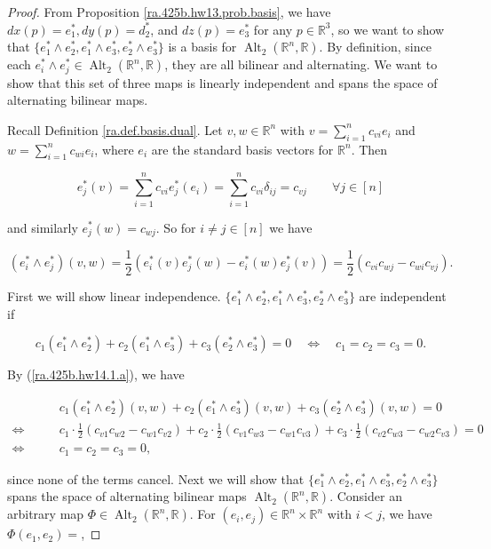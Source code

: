 \begin{proof}

From Proposition \ref{ra.425b.hw13.prob.basis}, we have \(dx(p) = e_1^*, dy(p) = d_2^*\), and \(dz(p) = e_3^*\) for any \(p \in \mathbb{R}^3\), so we want to show that \(\{e_1^* \wedge e_2^*, e_1^* \wedge e_3^*, e_2^* \wedge e_3^*\}\) is a basis for \(\operatorname{Alt}_2(\mathbb{R}^n, \mathbb{R})\). By definition, since each \(e_i^* \wedge e_j^* \in  \operatorname{Alt}_2(\mathbb{R}^n, \mathbb{R})\), they are all bilinear and alternating. We want to show that this set of three maps is linearly independent and spans the space of alternating bilinear maps.

Recall Definition \ref{ra.def.basis.dual}. Let \(v, w \in \mathbb{R}^n\) with \(v = \sum_{i=1}^n c_{vi} e_i\) and \(w = \sum_{i=1}^n c_{wi} e_i\), where \(e_i\) are the standard basis vectors for \(\mathbb{R}^n\). Then

\[
e_j^*(v)  = \sum_{i=1}^n c_{vi} e_j^*(e_i) = \sum_{i=1}^n c_{vi} \delta_{ij} = c_{vj} \qquad \forall j \in [n]
\]

and similarly \(e_j^*(w) = c_{wj}\). So for \(i \neq j \in [n]\) we have

\begin{equation}\label{ra.425b.hw14.1.a}
(e_i^* \wedge e_j^*)(v,w) = \frac{1}{2}( e_i^*(v) e_j^*(w) - e_i^*(w) e_j^*(v)) = \frac{1}{2}( c_{vi} c_{wj} - c_{wi} c_{vj}).
\end{equation}

%

First we will show linear independence. \(\{e_1^* \wedge e_2^*, e_1^* \wedge e_3^*, e_2^* \wedge e_3^*\}\) are independent if 

\[
c_1 (e_1^* \wedge e_2^*) + c_2 (e_1^* \wedge e_3^*) + c_3 (e_2^* \wedge e_3^*) = 0 \quad \iff \quad c_1 = c_2 = c_3 = 0.
\]

By (\ref{ra.425b.hw14.1.a}), we have

\begin{align*}
& c_1 (e_1^* \wedge e_2^*)(v,w) + c_2 (e_1^* \wedge e_3^*)(v,w) + c_3 (e_2^* \wedge e_3^*)(v,w) = 0 
\\ \iff \qquad  & c_1  \cdot \frac{1}{2}( c_{v1} c_{w2} - c_{w1} c_{v2}) + c_2 \cdot \frac{1}{2}( c_{v1} c_{w3} - c_{w1} c_{v3}) + c_3 \cdot \frac{1}{2}( c_{v2} c_{w3} - c_{w2} c_{v3})= 0 
\\  \iff \quad & c_1 = c_2 = c_3 = 0,
\end{align*}

since none of the terms cancel. Next we will show that \(\{e_1^* \wedge e_2^*, e_1^* \wedge e_3^*, e_2^* \wedge e_3^*\}\) spans the space of alternating bilinear maps \(\operatorname{Alt}_2(\mathbb{R}^n, \mathbb{R})\). Consider an arbitrary map \(\Phi \in \operatorname{Alt}_2(\mathbb{R}^n, \mathbb{R})\). For \((e_i, e_j) \in \mathbb{R}^n \times \mathbb{R}^n\) with \(i < j\), we have \(\Phi(e_1, e_2) = \), 

\end{proof}

